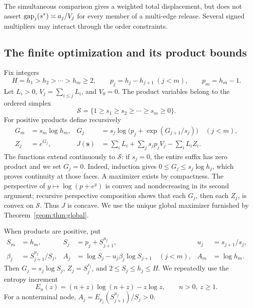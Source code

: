 \begin{remark}
The simultaneous comparison gives a weighted total displacement,
but does not assert
\(\operatorname{gap}_j(s^*)\asymp a_j/V_j\) for every member of a multi-edge release.
Several signed multipliers may interact through the order constraints.
\end{remark}


\subsection{The finite optimization and its product bounds}

Fix integers
\[
 H=h_1>h_2>\cdots>h_m\ge2,
 \qquad p_j=h_j-h_{j+1}\ (j<m),\qquad p_m=h_m-1.
\]
Let $L_i>0$, $V_j=\sum_{i\le j}L_i$, and $V_0=0$. The product
variables belong to the ordered simplex
\[
 \mathcal S=\{1\ge s_1\ge s_2\ge\cdots\ge s_m\ge0\}.
\]
For positive products define recursively
\begin{align}
 G_m&=s_m\log h_m,&
 G_j&=s_j\log\bigl(p_j+\exp(G_{j+1}/s_j)\bigr)\quad(j<m),
 \label{hier:eq:G}\\
 Z_j&=e^{G_j},&
 J(\mathbf s)&=\sum_iL_i+\sum_j s_jp_jV_j-\sum_iL_iZ_i.
 \label{hier:eq:J}
\end{align}
The functions extend continuously to $\mathcal S$: if $s_j=0$, the
entire suffix has zero product and we set $G_j=0$. Indeed, induction
gives $0\le G_j\le s_j\log h_j$, which proves continuity at those
faces. A maximizer exists by compactness. The perspective of
$y\mapsto\log(p+e^y)$ is convex and nondecreasing in its second
argument; recursive perspective composition shows that each $G_j$,
then each $Z_j$, is convex on $\mathcal S$. Thus $J$ is concave. We
use the unique global maximizer furnished by Theorem~\ref{geom:thm:global}.

When products are positive, put
\begin{align}
 S_m&=h_m,& S_j&=p_j+S_{j+1}^{u_j},&u_j&=s_{j+1}/s_j,\\
 \beta_j&=S_{j+1}^{u_j}/S_j,&
 A_j&=\log S_j-u_j\beta_j\log S_{j+1}\quad(j<m),&
 A_m&=\log h_m. \label{hier:eq:node}
\end{align}
Then $G_j=s_j\log S_j$, $Z_j=S_j^{s_j}$, and
$2\le S_j\le h_j\le H$. We repeatedly use the entropy increment
\begin{equation}
 E_n(z)=(n+z)\log(n+z)-z\log z,
 \qquad n>0,\ z\ge1. \label{hier:eq:entropy}
\end{equation}
For a nonterminal node, $A_j=E_{p_j}(S_{j+1}^{u_j})/S_j>0$.

